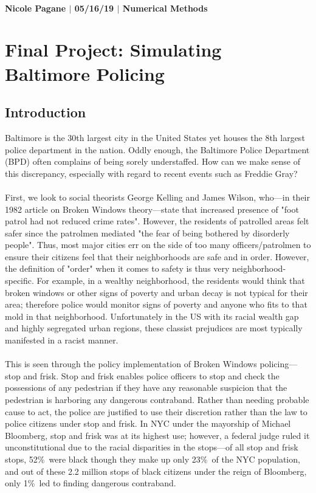 \documentclass[10pt]{article}
\begin{document}
\paragraph{Nicole Pagane $|$ 05/16/19 $|$ Numerical Methods}

\section*{Final Project: Simulating Baltimore Policing}

\subsection*{Introduction}
Baltimore is the 30th largest city in the United States yet houses the 8th largest police department in the nation. Oddly enough, the Baltimore Police Department (BPD) often complains of being sorely understaffed. How can we make sense of this discrepancy, especially with regard to recent events such as Freddie Gray?\\
\\
First, we look to social theorists George Kelling and James Wilson, who---in their 1982 article on Broken Windows theory---state that increased presence of "foot patrol had not reduced crime rates". However, the residents of patrolled areas felt safer since the patrolmen mediated "the fear of being bothered by disorderly people". Thus, most major cities err on the side of too many officers/patrolmen to ensure their citizens feel that their neighborhoods are safe and in order. However, the definition of "order" when it comes to safety is thus very neighborhood-specific. For example, in a wealthy neighborhood, the  residents would think that broken windows or other signs of poverty and urban decay is not typical for their area; therefore police would monitor signs of poverty and anyone who fits to that mold in that neighborhood. Unfortunately in the US with its racial wealth gap and highly segregated urban regions, these classist prejudices are most typically manifested in a racist manner.\\
\\
This is seen through the policy implementation of Broken Windows policing---stop and frisk. Stop and frisk enables police officers to stop and check the possessions of any pedestrian if they have any reasonable suspicion that the pedestrian is harboring any dangerous contraband. Rather than needing  probable cause to act, the police are justified to use their discretion rather than the law to police citizens under stop and frisk. In NYC under the mayorship of Michael Bloomberg, stop and frisk was at its highest use; however, a federal judge ruled it unconstitutional due to the racial disparities in the stops---of all stop and frisk stops, 52\%\ were black though they make up only 23\%\ of the NYC population, and out of these 2.2 million stops of black citizens under the reign of Bloomberg, only 1\%\ led to finding dangerous contraband.\\
\end{document}
